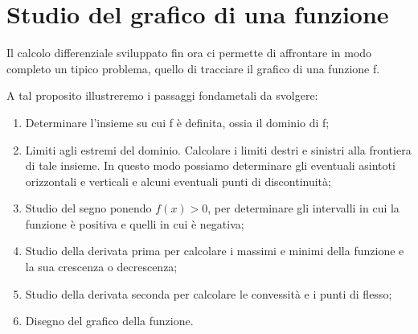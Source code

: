 \chapter{Studio del grafico di una funzione}
Il calcolo differenziale sviluppato fin ora ci permette di affrontare in modo completo un tipico problema, quello di tracciare il grafico di una funzione f.

A tal proposito illustreremo i passaggi fondametali da svolgere:
\begin{enumerate}
    \item Determinare l'insieme su cui f è definita, ossia il dominio di f;
    \item Limiti agli estremi del dominio. Calcolare i limiti destri e sinistri alla frontiera di tale insieme. In questo modo possiamo determinare gli eventuali asintoti orizzontali e verticali e alcuni eventuali punti di discontinuità;
    \item Studio del segno ponendo $f(x)>0$, per determinare gli intervalli in cui la funzione è positiva e quelli in cui è negativa;
    \item Studio della derivata prima per calcolare i massimi e minimi della funzione e la sua crescenza o decrescenza;
    \item Studio della derivata seconda per calcolare le convessità e i punti di flesso;
    \item Disegno del grafico della funzione.
\end{enumerate}